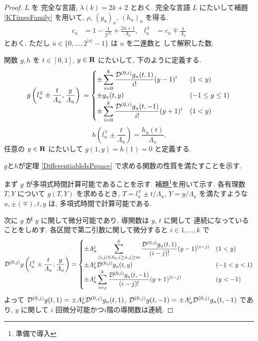 \begin{proof}
 $L$ を \PSPACE 完全な言語, $\lambda(k) = 2k+2$ とおく.
 \PSPACE 完全な言語 $L$ にたいして補題 \ref{KTimesFamily} を用いて,
 $\rho$, $(g_u)_u$, $(h_u)_u$ を得る.
 \begin{align}
  c_u &= 1-\frac{1}{2^|u|}+\frac{2\bar{u}+1}{\Lambda_u},&
   l_u^\mp &= c_u\mp\frac{1}{\varLambda_u}
 \end{align}
 とおく. ただし $\bar u \in \{0, \dots, 2^{|u|} - 1\}$ は $u$ を二進数と
 して解釈した数.

 関数 $g,h$ を $t \in [0,1]$, $y \in \mathbf R$ にたいして, 下のように定義する.
 \begin{equation}
  g\left(l^\mp_u \pm \frac{t}{\varLambda_u}, \frac{y}{\varLambda_u}\right) \\
   = \begin{cases}
      \pm \displaystyle \sum_{i=0}^k \frac{\mathcal D^{(0,i)}g_u(t,1)}{i!} (y-1)^i 
      &  (1<y) \\
      \pm g_u(t, y)      & (-1 \le y \le 1) \\
      \pm \displaystyle \sum_{i=0}^k \frac{\mathcal D^{(0,i)}g_u(t,-1)}{i!} (y+1)^i  
      &  (1<y) \\
     \end{cases}
 \end{equation}
 \begin{equation}
  h \left( l^\mp_u \pm \frac{t}{\Lambda_u} \right) 
   = \frac{h_u(t)}{\Lambda_u}.
 \end{equation}
 任意の $y\in \mathbf R$ にたいして $g(1,y) = h(1) = 0$ と定義する.

 $g$と$h$が定理 \ref{DifferentiableIsPspace} で求める関数の性質を満たすことを示す.
 
 まず $g$ が多項式時間計算可能であることを示す.
 補題\footnote{準備で導入}を用いて示す.
 各有理数 $T,Y$ について $g(T, Y)$ を求めるとき,
 $T=l_u^\mp \pm t/\Lambda_u$, $Y = y/\Lambda_u$ を満たすような
 $u, \pm(\mp), t, y$ は, 多項式時間で計算可能である.

 次に $g$ が $y$ に関して微分可能であり, 導関数は $y$, $t$ に関して
 連続になっていることをしめす. 
 各区間で第二引数に関して微分すると $i \in {1,\dots,k}$ で
 \begin{equation}
  \mathcal D^{(0,j)}g \left(l^\mp_u \pm \frac{t}{\varLambda_u}, \frac{y}{\varLambda_u} \right)
   = \begin{cases}
      \displaystyle \pm \varLambda_u^j \sum_{\left<i,j\right>\in S_k, i\ge n, j\ge m}^k 
      \frac{\mathcal D^{(0,i)}g_u(t,1)}{(i-j)!} (y-1)^{(i-j)} & (1 < y) \\
      \pm \varLambda_u^j \mathcal D^{(0,j)}g_u(t,y) & (-1 < y < 1) \\
      \displaystyle \pm \varLambda_u^j \sum_{i=j}^k 
      \frac{\mathcal D^{(0,i)}g_u(t,-1)}{(i-j)!} (y+1)^{(i-j)} & (y < -1) 
     \end{cases}
 \end{equation}
 よって $\mathcal D^{(0,j)}g(t, 1) = \pm \varLambda_u^j \mathcal D^{(0,j)}g_u (t,1)$, 
 $\mathcal D^{(0,j)}g(t, -1) = \pm \varLambda_u^i \mathcal D^{(0,j)}g_u (t,-1)$ であり,
 $y$ に関して $i$ 回微分可能かつ$i$階の導関数は連続.
 

\end{proof}
